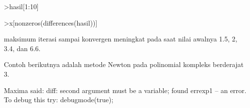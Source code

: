 \documentclass[a4paper,10pt]{article}
\begin{document}
\begin{eulernotebook}
\begin{eulercomment}
\begin{eulercomment}
\begin{eulercomment}
\begin{eulercomment}
\begin{eulercomment}
\begin{eulercomment}
\begin{eulercomment}
\begin{eulercomment}
\begin{eulercomment}
\begin{eulercomment}
\begin{eulerprompt}
>hasil[1:10]
\end{eulerprompt}
\begin{euleroutput}
  [4,  5,  5,  5,  5,  5,  6,  6,  6,  6]
\end{euleroutput}
\begin{eulerprompt}
>x[nonzeros(differences(hasil))]
\end{eulerprompt}
\begin{euleroutput}
  [1.5,  2,  3.4,  6.6]
\end{euleroutput}
\begin{eulercomment}
maksimum iterasi sampai konvergen meningkat pada saat nilai awalnya 1.5, 2, 3.4, dan 6.6.

Contoh berikutnya adalah metode Newton pada polinomial kompleks berderajat 3.
\end{eulercomment}
\begin{euleroutput}
  Maxima said:
  diff: second argument must be a variable; found errexp1
   -- an error. To debug this try: debugmode(true);
  

\end{euleroutput}
\end{eulercomment}
\end{eulercomment}
\end{eulercomment}
\end{eulercomment}
\end{eulercomment}
\end{eulercomment}
\end{eulercomment}
\end{eulercomment}
\end{eulercomment}
\end{eulercomment}
\end{eulernotebook}
\end{document}

